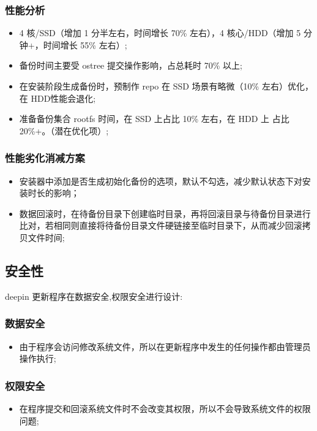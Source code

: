 \documentclass{utart}
\begin{document}
\subsubsection{性能分析}
\begin{itemize}[leftmargin=4em]
\item 4 核/SSD（增加 1 分半左右，时间增长 70\% 左右），4 核心/HDD（增加 5 分钟+，时间增长 55\% 左右）;
\item 备份时间主要受 ostree 提交操作影响，占总耗时 70\% 以上;
\item 在安装阶段生成备份时，预制作 repo 在 SSD 场景有略微（10\% 左右）优化，在 HDD性能会退化;
\item 准备备份集合 rootfs 时间，在 SSD 上占比 10\% 左右，在 HDD 上 占比 20\%+。（潜在优化项）;
\end{itemize}

\subsubsection{性能劣化消减方案}
\begin{itemize}[leftmargin=4em]
\item 安装器中添加是否生成初始化备份的选项，默认不勾选，减少默认状态下对安装时长的影响；
\item 数据回滚时，在待备份目录下创建临时目录，再将回滚目录与待备份目录进行比对，若相同则直接将待备份目录文件硬链接至临时目录下，从而减少回滚拷贝文件时间;
\end{itemize}

\subsection{安全性}
deepin 更新程序在数据安全,权限安全进行设计:

\subsubsection{数据安全}
\begin{itemize}[leftmargin=4em]
  \item 由于程序会访问修改系统文件，所以在更新程序中发生的任何操作都由管理员操作执行;
\end{itemize}

\subsubsection{权限安全}
\begin{itemize}[leftmargin=4em]
  \item 在程序提交和回滚系统文件时不会改变其权限，所以不会导致系统文件的权限问题;
\end{itemize}
\end{document}
